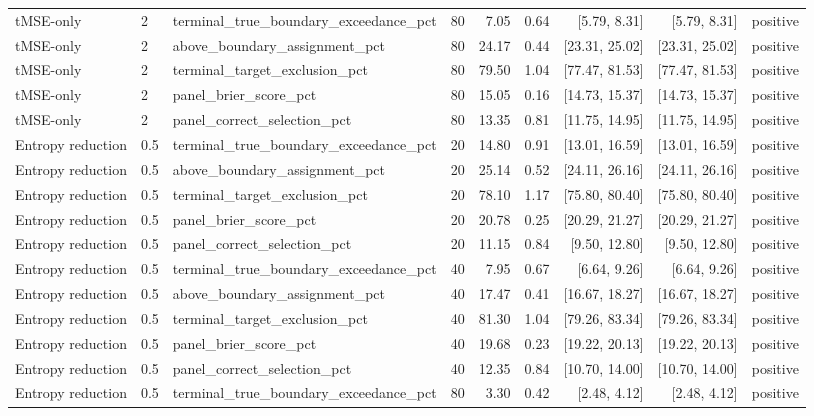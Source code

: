 \begin{longtable}{lllrrrrrl}
tMSE-only & 2 & terminal\_true\_boundary\_exceedance\_pct & 80 & 7.05 & 0.64 & [5.79, 8.31] & [5.79, 8.31] & positive \\
tMSE-only & 2 & above\_boundary\_assignment\_pct & 80 & 24.17 & 0.44 & [23.31, 25.02] & [23.31, 25.02] & positive \\
tMSE-only & 2 & terminal\_target\_exclusion\_pct & 80 & 79.50 & 1.04 & [77.47, 81.53] & [77.47, 81.53] & positive \\
tMSE-only & 2 & panel\_brier\_score\_pct & 80 & 15.05 & 0.16 & [14.73, 15.37] & [14.73, 15.37] & positive \\
tMSE-only & 2 & panel\_correct\_selection\_pct & 80 & 13.35 & 0.81 & [11.75, 14.95] & [11.75, 14.95] & positive \\
Entropy reduction & 0.5 & terminal\_true\_boundary\_exceedance\_pct & 20 & 14.80 & 0.91 & [13.01, 16.59] & [13.01, 16.59] & positive \\
Entropy reduction & 0.5 & above\_boundary\_assignment\_pct & 20 & 25.14 & 0.52 & [24.11, 26.16] & [24.11, 26.16] & positive \\
Entropy reduction & 0.5 & terminal\_target\_exclusion\_pct & 20 & 78.10 & 1.17 & [75.80, 80.40] & [75.80, 80.40] & positive \\
Entropy reduction & 0.5 & panel\_brier\_score\_pct & 20 & 20.78 & 0.25 & [20.29, 21.27] & [20.29, 21.27] & positive \\
Entropy reduction & 0.5 & panel\_correct\_selection\_pct & 20 & 11.15 & 0.84 & [9.50, 12.80] & [9.50, 12.80] & positive \\
Entropy reduction & 0.5 & terminal\_true\_boundary\_exceedance\_pct & 40 & 7.95 & 0.67 & [6.64, 9.26] & [6.64, 9.26] & positive \\
Entropy reduction & 0.5 & above\_boundary\_assignment\_pct & 40 & 17.47 & 0.41 & [16.67, 18.27] & [16.67, 18.27] & positive \\
Entropy reduction & 0.5 & terminal\_target\_exclusion\_pct & 40 & 81.30 & 1.04 & [79.26, 83.34] & [79.26, 83.34] & positive \\
Entropy reduction & 0.5 & panel\_brier\_score\_pct & 40 & 19.68 & 0.23 & [19.22, 20.13] & [19.22, 20.13] & positive \\
Entropy reduction & 0.5 & panel\_correct\_selection\_pct & 40 & 12.35 & 0.84 & [10.70, 14.00] & [10.70, 14.00] & positive \\
Entropy reduction & 0.5 & terminal\_true\_boundary\_exceedance\_pct & 80 & 3.30 & 0.42 & [2.48, 4.12] & [2.48, 4.12] & positive \\

\end{longtable}
